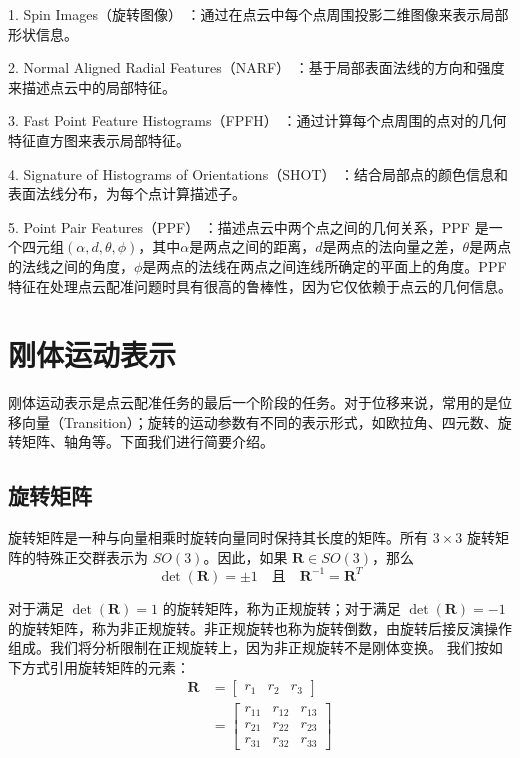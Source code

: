 1. Spin Images（旋转图像） \cite{johnson1997spin}：通过在点云中每个点周围投影二维图像来表示局部形状信息。

2. Normal Aligned Radial Features（NARF） \cite{steder2010narf}：基于局部表面法线的方向和强度来描述点云中的局部特征。

3. Fast Point Feature Histograms（FPFH） \cite{rusu2009fast}：通过计算每个点周围的点对的几何特征直方图来表示局部特征。

4. Signature of Histograms of Orientations（SHOT） \cite{salti2014shot}：结合局部点的颜色信息和表面法线分布，为每个点计算描述子。

5. Point Pair Features（PPF） \cite{deng2018ppfnet}：描述点云中两个点之间的几何关系，PPF 是一个四元组$(\alpha, d, \theta, \phi)$，其中$\alpha$是两点之间的距离，$d$是两点的法向量之差，$\theta$是两点的法线之间的角度，$\phi$是两点的法线在两点之间连线所确定的平面上的角度。PPF特征在处理点云配准问题时具有很高的鲁棒性，因为它仅依赖于点云的几何信息。

\section{刚体运动表示}
刚体运动表示是点云配准任务的最后一个阶段的任务。对于位移来说，常用的是位移向量（Transition）；旋转的运动参数有不同的表示形式，如欧拉角\cite{pio1966euler}、四元数\cite{shoemake1985animating}、旋转矩阵\cite{horn1954doubly}、轴角\cite{diebel2006representing}等。下面我们进行简要介绍。

\subsection{旋转矩阵}
旋转矩阵是一种与向量相乘时旋转向量同时保持其长度的矩阵。所有 $3 \times 3$ 旋转矩阵的特殊正交群表示为 $SO(3)$。因此，如果 $\boldsymbol{R} \in SO(3)$，那么
\begin{equation}
\det (\boldsymbol{R}) = \pm1 \quad \text{且} \quad \boldsymbol{R}^{-1} = \boldsymbol{R}^T
\end{equation}

对于满足 $\det (\boldsymbol{R}) = 1$ 的旋转矩阵，称为正规旋转；对于满足 $\det (\boldsymbol{R}) = -1$ 的旋转矩阵，称为非正规旋转。非正规旋转也称为旋转倒数，由旋转后接反演操作组成。我们将分析限制在正规旋转上，因为非正规旋转不是刚体变换。
我们按如下方式引用旋转矩阵的元素：
\begin{align}
    \boldsymbol{R} &=
    \begin{bmatrix}
    r_1 & r_2 & r_3
    \end{bmatrix} \\
    &=
    \begin{bmatrix}
    r_{11} & r_{12} & r_{13} \\
    r_{21} & r_{22} & r_{23} \\
    r_{31} & r_{32} & r_{33}
    \end{bmatrix}
\end{align}

